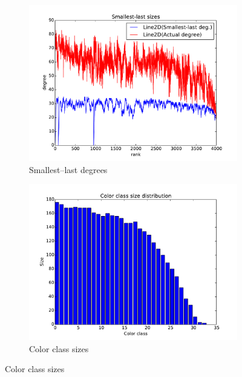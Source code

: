 \documentclass[oneside, titlepage]{scrartcl}
\begin{document}
\begin{figure}[!h]
\begin{subfigure}{0.5\textwidth}
	\centering
	\includegraphics[width=0.9\linewidth]{figures/ordering6.pdf}
	\caption{Smallest--last degrees}
\end{subfigure}%
\begin{subfigure}{0.5\textwidth}
	\centering
	\includegraphics[width=0.9\linewidth]{figures/colors6.pdf}
	\caption{Color class sizes}
\end{subfigure}


\end{figure}
\end{document}
